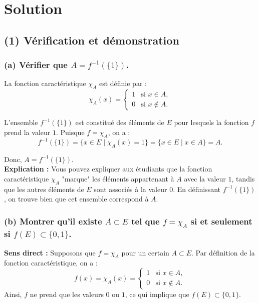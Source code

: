 \documentclass[a4paper,oneside,12pt]{amsbook}
\theoremstyle{definition}
\theoremstyle{remark}
\begin{document}
\section*{Solution}

\subsection*{(1) Vérification et démonstration}

\subsubsection*{(a) Vérifier que $A = f^{-1}(\{1\})$.}

La fonction caractéristique $\chi_A$ est définie par :
\[
\chi_A(x) = 
\begin{cases} 
1 & \text{si } x \in A, \\
0 & \text{si } x \notin A.
\end{cases}
\]

L'ensemble $f^{-1}(\{1\})$ est constitué des éléments de $E$ pour lesquels la fonction $f$ prend la valeur $1$. Puisque $f = \chi_A$, on a :
\[
f^{-1}(\{1\}) = \{x \in E \mid \chi_A(x) = 1\} = \{x \in E \mid x \in A\} = A.
\]

Donc, $A = f^{-1}(\{1\})$. \\

\textbf{Explication :} Vous pouvez expliquer aux étudiants que la fonction caractéristique $\chi_A$ "marque" les éléments appartenant à $A$ avec la valeur $1$, tandis que les autres éléments de $E$ sont associés à la valeur $0$. En définissant $f^{-1}(\{1\})$, on trouve bien que cet ensemble correspond à $A$.

\subsubsection*{(b) Montrer qu'il existe $A \subset E$ tel que $f = \chi_A$ si et seulement si $f(E) \subset \{0,1\}$.}

\textbf{Sens direct :} Supposons que $f = \chi_A$ pour un certain $A \subset E$. Par définition de la fonction caractéristique, on a :
\[
f(x) = \chi_A(x) =
\begin{cases} 
1 & \text{si } x \in A, \\
0 & \text{si } x \notin A.
\end{cases}
\]
Ainsi, $f$ ne prend que les valeurs $0$ ou $1$, ce qui implique que $f(E) \subset \{0,1\}$. \\
\end{document}
